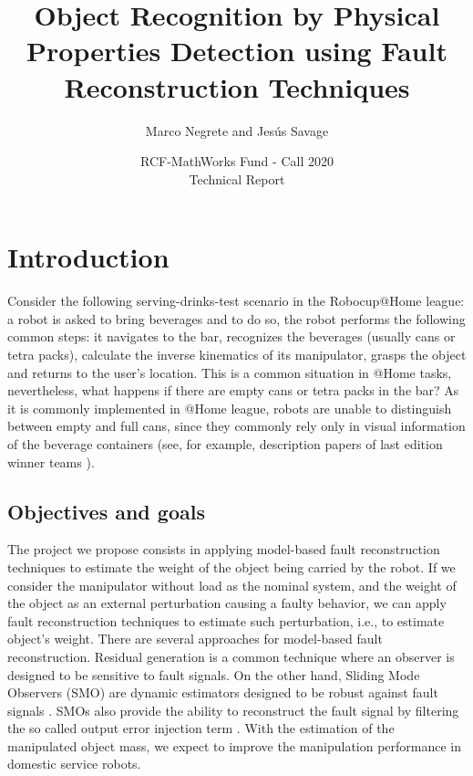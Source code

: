 \documentclass[a4paper, 10pt]{article}
\title{Object Recognition by Physical Properties Detection using Fault Reconstruction Techniques}
\author{Marco Negrete and Jesús Savage}
\date{RCF-MathWorks Fund - Call 2020\\Technical Report}
\begin{document}
\maketitle

\tableofcontents
\section{Introduction}
\thispagestyle{mypagestyle}
Consider the following serving-drinks-test scenario in the Robocup@Home league: a robot is asked to bring beverages and to do so, the robot performs the following common steps: it navigates to the bar, recognizes the beverages (usually cans or tetra packs), calculate the inverse kinematics of its manipulator, grasps the object and returns to the user's location. This is a common situation in @Home tasks, nevertheless, what happens if there are empty cans or tetra packs in the bar? As it is commonly implemented in @Home league, robots are unable to distinguish between empty and full cans, since they commonly rely only in visual information of the beverage containers (see, for example, description papers of last edition winner teams \cite{tdp2019Eindhoven, tdp2019Homer, tdp2019UTS}).
\subsection{Objectives and goals}
The project we propose consists in applying model-based fault reconstruction techniques \cite{ding2013model} to estimate the weight of the object being carried by the robot. If we consider the manipulator without load  as the nominal system, and the weight of the object as an external perturbation causing a faulty behavior, we can apply fault reconstruction techniques to estimate such perturbation, i.e., to estimate object's weight. There are several approaches for model-based fault reconstruction. Residual generation is a common technique where an observer is designed to be sensitive to fault signals. On the other hand, Sliding Mode Observers (SMO) are dynamic estimators designed to be robust against fault signals \cite{shtessel2014sliding}. SMOs also provide the ability to reconstruct the fault signal by filtering the so called output error injection term \cite{alwi2011fault}. With the estimation of the manipulated object mass, we expect to improve the manipulation performance in domestic service robots. 
\end{document}
